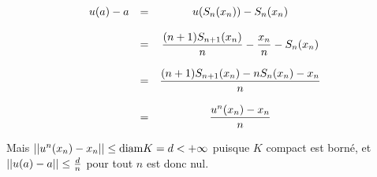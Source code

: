 {\begin{enumerate}
{$$\begin{array}{ccc}
         u(a)-a&=& u(S_n(x_n))-S_n(x_n)\\
&&\\

        &=&\displaystyle{(n+1)S_{n+1}(x_n)\over n}-{x_n\over n}-S_n(x_n)
\\
&&\\

&=&\displaystyle{(n+1)S_{n+1}(x_n)-nS_n(x_n)-x_n\over n}\\
&&\\
&=&\displaystyle{u^n(x_n)-x_n\over n}
\end{array}$$

Mais $||u^n(x_n)-x_n||\leq \hbox{diam} K=d<+\infty$ puisque $K$ compact est
borné, et 
$||u(a)-a||\leq {d\over n}$ pour tout $n$ est donc nul.}
\end{enumerate}
}
